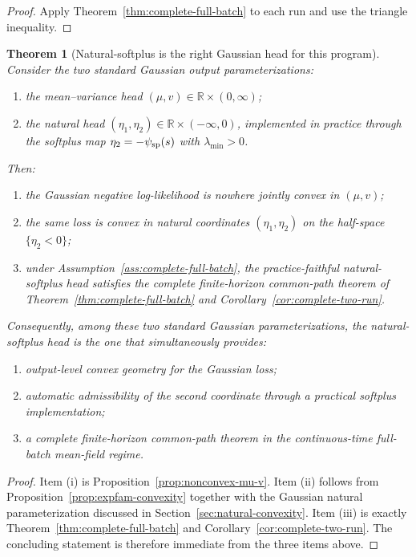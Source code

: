 \documentclass[11pt]{article}
\newtheorem{theorem}{Theorem}
\theoremstyle{definition}
\newcommand{\R}{\mathbb{R}}
\begin{document}
\begin{proof}
Apply Theorem~\ref{thm:complete-full-batch} to each run and use the triangle
inequality.
\end{proof}

\begin{theorem}[Natural-softplus is the right Gaussian head for this program]
\label{thm:natural-softplus-justification}
Consider the two standard Gaussian output parameterizations:
\begin{enumerate}[label=(\alph*)]
  \item the mean--variance head $(\mu,v)\in \R\times(0,\infty)$;
  \item the natural head $(\eta_1,\eta_2)\in \R\times(-\infty,0)$, implemented
  in practice through the softplus map
  $\eta_2=-\psi_{\rm sp}(s)$ with $\lambda_{\min}>0$.
\end{enumerate}
Then:
\begin{enumerate}[label=(\roman*)]
  \item the Gaussian negative log-likelihood is nowhere jointly convex in
  $(\mu,v)$;
  \item the same loss is convex in natural coordinates
  $(\eta_1,\eta_2)$ on the half-space $\{\eta_2<0\}$;
  \item under Assumption~\ref{ass:complete-full-batch}, the practice-faithful
  natural-softplus head satisfies the complete finite-horizon common-path
  theorem of Theorem~\ref{thm:complete-full-batch} and
  Corollary~\ref{cor:complete-two-run}.
\end{enumerate}
Consequently, among these two standard Gaussian parameterizations, the
natural-softplus head is the one that simultaneously provides:
\begin{enumerate}[label=(\alph*$'$)]
  \item output-level convex geometry for the Gaussian loss;
  \item automatic admissibility of the second coordinate through a practical
  softplus implementation;
  \item a complete finite-horizon common-path theorem in the continuous-time
  full-batch mean-field regime.
\end{enumerate}
\end{theorem}

\begin{proof}
Item (i) is Proposition~\ref{prop:nonconvex-mu-v}. Item (ii) follows from
Proposition~\ref{prop:expfam-convexity} together with the Gaussian natural
parameterization discussed in Section~\ref{sec:natural-convexity}. Item (iii) is exactly
Theorem~\ref{thm:complete-full-batch} and Corollary~\ref{cor:complete-two-run}.
The concluding statement is therefore immediate from the three items above.
\end{proof}
\end{document}
